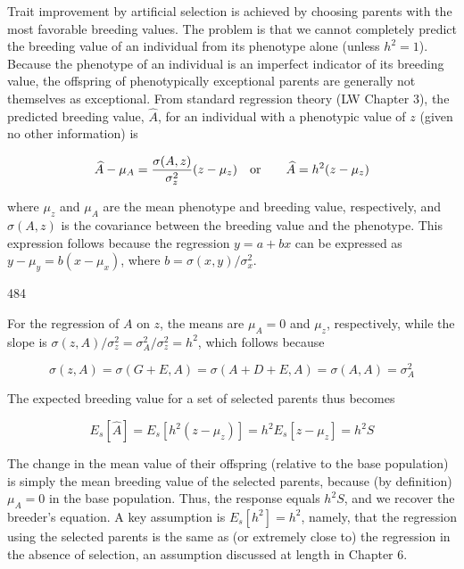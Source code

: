 \documentclass{article}
\begin{document}
Trait improvement by artificial selection is achieved by choosing parents with the most favorable breeding values. The problem is that we cannot completely predict the breeding value of an individual from its phenotype alone (unless  $ h^2 = 1 $). Because the phenotype of an individual is an imperfect indicator of its breeding value, the offspring of phenotypically exceptional parents are generally not themselves as exceptional. From standard regression theory (LW Chapter 3), the predicted breeding value,  $ \widehat{A} $, for an individual with a phenotypic value of  $ z $ (given no other information) is

\begin{equation}
\begin{align*}\widehat{A}-\mu_A={\sigma(A,z)\over\sigma_z^2}(z-\mu_z)\quad{\rm or}\qquad\widehat{A}=h^2(z-\mu_z)\end{align*}
\end{equation}

where $\mu_z$ and $\mu_A$ are the mean phenotype and breeding value, respectively, and $\sigma(A, z)$ is the covariance between the breeding value and the phenotype. This expression follows because the regression $y = a + bx$ can be expressed as $y - \mu_y = b(x - \mu_x)$, where $b = \sigma(x, y)/\sigma_x^2$.

484

For the regression of $A$ on $z$, the means are $\mu_A = 0$ and $\mu_z$, respectively, while the slope is $\sigma(z, A)/\sigma_z^2 = \sigma_A^2/\sigma_z^2 = h^2$, which follows because

\begin{equation}
\sigma(z,A)=\sigma(G+E,A)=\sigma(A+D+E,A)=\sigma(A,A)=\sigma_{A}^{2}
\end{equation}

The expected breeding value for a set of selected parents thus becomes

\begin{equation}
E_{s}[\widehat{A}]=E_{s}[h^{2}(z-\mu_{z})]=h^{2}E_{s}[z-\mu_{z}]=h^{2}S
\end{equation}

The change in the mean value of their offspring (relative to the base population) is simply the mean breeding value of the selected parents, because (by definition)  $ \mu_A = 0 $ in the base population. Thus, the response equals  $ h^2 S $, and we recover the breeder's equation. A key assumption is  $ E_s[h^2] = h^2 $, namely, that the regression using the selected parents is the same as (or extremely close to) the regression in the absence of selection, an assumption discussed at length in Chapter 6.
\end{document}
